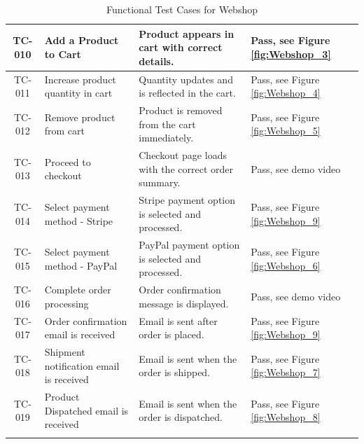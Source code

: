 \documentclass{llncs}
\begin{document}
\begin{longtable}{|c|>{\raggedright}p{4.8cm}|p{6cm}|>{\centering\arraybackslash}p{2cm}|}
    TC-010                & Add a Product to Cart                      & Product appears in cart with correct details.             & Pass, see Figure \ref{fig:Webshop_3}         \\ \hline
    TC-011                & Increase product quantity in cart          & Quantity updates and is reflected in the cart.            & Pass, see Figure \ref{fig:Webshop_4}           \\ \hline
    TC-012                & Remove product from cart                   & Product is removed from the cart immediately.             & Pass, see Figure \ref{fig:Webshop_5}           \\ \hline
    TC-013                & Proceed to checkout                        & Checkout page loads with the correct order summary.       & Pass, see demo video         \\ \hline
    TC-014                & Select payment method - Stripe             & Stripe payment option is selected and processed.          & Pass, see Figure \ref{fig:Webshop_9}           \\ \hline
    TC-015                & Select payment method - PayPal             & PayPal payment option is selected and processed.          & Pass, see Figure \ref{fig:Webshop_6}           \\ \hline
    TC-016                & Complete order processing                  & Order confirmation message is displayed.                  & Pass, see demo video         \\ \hline
    TC-017                & Order confirmation email is received       & Email is sent after order is placed.                      & Pass, see Figure \ref{fig:Webshop_9}           \\ \hline
    TC-018                & Shipment notification email is received    & Email is sent when the order is shipped.                  & Pass, see Figure \ref{fig:Webshop_7}           \\ \hline
    TC-019                & Product Dispatched email is received       & Email is sent when the order is dispatched.               & Pass, see Figure \ref{fig:Webshop_8}           \\ \hline
    \caption{Functional Test Cases for Webshop} \label{tab:functional-test-cases}
\end{longtable}
\end{document}
